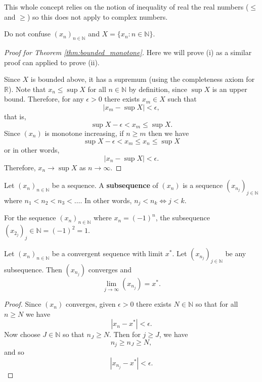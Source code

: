 \begin{remark}
    This whole concept relies on the notion of inequality of real the real numbers ($\leq$ and $\geq$) so this does not apply to complex numbers.
\end{remark}

\begin{remark}
    Do not confuse $(x_n)_{n\in\mathbb N}$ and $X=\{x_n:n\in\mathbb N\}$.
\end{remark}

\begin{proof}[Proof for Theorem \ref{thm:bounded_monotone}]
    Here we will prove (i) as a similar proof can applied to prove (ii).
    
    Since $X$ is bounded above, it has a supremum (using the completeness axiom for $\mathbb R$). Note that $x_n\leq\sup{X}$ for all $n\in\mathbb N$ by definition, since $\sup{X}$ is an upper bound. Therefore, for any $\epsilon>0$ there exists $x_m\in X$ such that \[|x_m-\sup{X}|<\epsilon,\] that is, \[\sup{X}-\epsilon<x_m\leq\sup{X}.\] Since $(x_n)$ is monotone increasing, if $n\geq m$ then we have \[\sup{X}-\epsilon<x_m\leq x_n\leq\sup{X}\] or in other words, \[|x_n-\sup{X}|<\epsilon.\] Therefore, $x_n\to\sup{X}$ as $n\to\infty$.
\end{proof}


\begin{definition}
    Let $(x_n)_{n\in\mathbb N}$ be a sequence. A \textbf{subsequence} of $(x_n)$ is a sequence $(x_{n_j})_{j\in\mathbb N}$ where $n_1<n_2<n_3<\ldots$. In other words, $n_j<n_k\iff j<k$.
\end{definition}

\begin{example}
    For the sequence $(x_n)_{n\in\mathbb N}$ where $x_n=(-1)^n$, the subsequence $(x_{2_j})_j\in\mathbb N=(-1)^2=1$.
\end{example}

\begin{proposition}
    Let $(x_n)_{n\in\mathbb N}$ be a convergent sequence with limit $x^*$. Let $(x_{n_j})_{j\in\mathbb N}$ be any subsequence. Then $(x_{n_j})$ converges and \[\lim_{j\to\infty}(x_{n_j})=x^*.\]
\end{proposition}

\begin{proof}
    Since $(x_n)$ converges, given $\epsilon>0$ there exists $N\in\mathbb N$ so that for all $n\geq N$ we have \[|x_n-x^*|<\epsilon.\] Now choose $J\in\mathbb N$ so that $n_J\geq N$. Then for $j\geq J$, we have \[n_j\geq n_J\geq N,\] and so \[|x_{n_j}-x^*|<\epsilon.\]
\end{proof}

